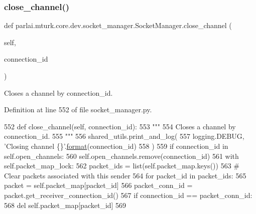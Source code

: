 \subsubsection{\texorpdfstring{close\+\_\+channel()}{close\_channel()}}
{\footnotesize\ttfamily def parlai.\+mturk.\+core.\+dev.\+socket\+\_\+manager.\+Socket\+Manager.\+close\+\_\+channel (\begin{DoxyParamCaption}\item[{}]{self,  }\item[{}]{connection\+\_\+id }\end{DoxyParamCaption})}

\begin{DoxyVerb}Closes a channel by connection_id.
\end{DoxyVerb}
 

Definition at line 552 of file socket\+\_\+manager.\+py.


\begin{DoxyCode}
552     \textcolor{keyword}{def }close\_channel(self, connection\_id):
553         \textcolor{stringliteral}{"""}
554 \textcolor{stringliteral}{        Closes a channel by connection\_id.}
555 \textcolor{stringliteral}{        """}
556         shared\_utils.print\_and\_log(
557             logging.DEBUG, \textcolor{stringliteral}{'Closing channel \{\}'}.\hyperlink{namespaceparlai_1_1chat__service_1_1services_1_1messenger_1_1shared__utils_a32e2e2022b824fbaf80c747160b52a76}{format}(connection\_id)
558         )
559         \textcolor{keywordflow}{if} connection\_id \textcolor{keywordflow}{in} self.open\_channels:
560             self.open\_channels.remove(connection\_id)
561             with self.packet\_map\_lock:
562                 packet\_ids = list(self.packet\_map.keys())
563                 \textcolor{comment}{# Clear packets associated with this sender}
564                 \textcolor{keywordflow}{for} packet\_id \textcolor{keywordflow}{in} packet\_ids:
565                     packet = self.packet\_map[packet\_id]
566                     packet\_conn\_id = packet.get\_receiver\_connection\_id()
567                     \textcolor{keywordflow}{if} connection\_id == packet\_conn\_id:
568                         del self.packet\_map[packet\_id]
569 
\end{DoxyCode}
\mbox{\label{classparlai_1_1mturk_1_1core_1_1dev_1_1socket__manager_1_1SocketManager_a5445dd4fe36e2aff2efb2d73c998abcb}} 
